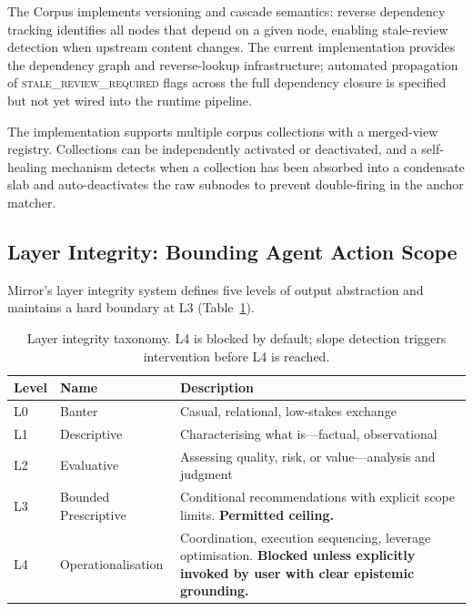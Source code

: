 \documentclass[11pt,a4paper]{article}
\begin{document}
The Corpus implements versioning and cascade semantics: reverse dependency tracking identifies all nodes that depend on a given node, enabling stale-review detection when upstream content changes.
The current implementation provides the dependency graph and reverse-lookup infrastructure; automated propagation of \textsc{stale\_review\_required} flags across the full dependency closure is specified but not yet wired into the runtime pipeline.

The implementation supports multiple corpus collections with a merged-view registry.
Collections can be independently activated or deactivated, and a self-healing mechanism detects when a collection has been absorbed into a condensate slab and auto-deactivates the raw subnodes to prevent double-firing in the anchor matcher.

\subsection{Layer Integrity: Bounding Agent Action Scope}
\label{sec:layer_integrity}

Mirror's layer integrity system defines five levels of output abstraction and maintains a hard boundary at L3 (Table~\ref{tab:layers}).

\begin{table}[t]
\centering
\caption{Layer integrity taxonomy. L4 is blocked by default; slope detection triggers intervention before L4 is reached.}
\label{tab:layers}
\small
\begin{tabularx}{\textwidth}{llX}
\toprule
\textbf{Level} & \textbf{Name} & \textbf{Description} \\
\midrule
L0 & Banter & Casual, relational, low-stakes exchange \\
L1 & Descriptive & Characterising what is---factual, observational \\
L2 & Evaluative & Assessing quality, risk, or value---analysis and judgment \\
L3 & Bounded Prescriptive & Conditional recommendations with explicit scope limits. \textbf{Permitted ceiling.} \\
L4 & Operationalisation & Coordination, execution sequencing, leverage optimisation. \textbf{Blocked unless explicitly invoked by user with clear epistemic grounding.} \\
\bottomrule
\end{tabularx}
\end{table}
\end{document}
